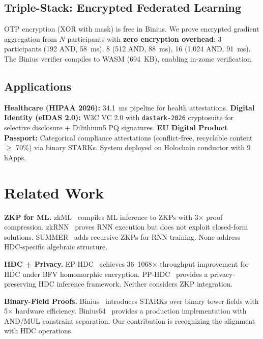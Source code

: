 \documentclass[11pt,twocolumn]{article}
\begin{document}
\subsection{Triple-Stack: Encrypted Federated Learning}

OTP encryption (XOR with mask) is free in Binius. We prove encrypted gradient aggregation from $N$ participants with \textbf{zero encryption overhead}: 3 participants (192 AND, 58~ms), 8 (512 AND, 88~ms), 16 (1,024 AND, 91~ms). The Binius verifier compiles to WASM (694~KB), enabling in-zome verification.

\subsection{Applications}

\textbf{Healthcare (HIPAA 2026):} 34.1~ms pipeline for health attestations. \textbf{Digital Identity (eIDAS 2.0):} W3C VC 2.0 with \texttt{dastark-2026} cryptosuite for selective disclosure + Dilithium5 PQ signatures. \textbf{EU Digital Product Passport:} Categorical compliance attestations (conflict-free, recyclable content $\geq$ 70\%) via binary STARKs. System deployed on Holochain conductor with 9 hApps.

\section{Related Work}

\textbf{ZKP for ML.} zkML~\cite{zkml2024} compiles ML inference to ZKPs with 3$\times$ proof compression. zkRNN~\cite{zkrnn2026} proves RNN execution but does not exploit closed-form solutions. SUMMER~\cite{summer2025} adds recursive ZKPs for RNN training. None address HDC-specific algebraic structure.

\textbf{HDC + Privacy.} EP-HDC~\cite{ephdc2025} achieves 36--1068$\times$ throughput improvement for HDC under BFV homomorphic encryption. PP-HDC~\cite{pphdc2024} provides a privacy-preserving HDC inference framework. Neither considers ZKP integration.

\textbf{Binary-Field Proofs.} Binius~\cite{diamond2023binius} introduces STARKs over binary tower fields with 5$\times$ hardware efficiency. Binius64~\cite{binius64} provides a production implementation with AND/MUL constraint separation. Our contribution is recognizing the alignment with HDC operations.
\end{document}
